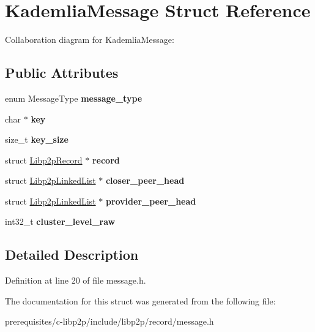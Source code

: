 \hypertarget{struct_kademlia_message}{}\section{Kademlia\+Message Struct Reference}
\label{struct_kademlia_message}


Collaboration diagram for Kademlia\+Message\+:
\subsection*{Public Attributes}
\begin{DoxyCompactItemize}
\item 
\mbox{\label{struct_kademlia_message_a3d1f6ddf5f040f5f9406c23cd481f46d}} 
enum Message\+Type {\bfseries message\+\_\+type}
\item 
\mbox{\label{struct_kademlia_message_a5bd751792a56acbd61fc4fd094b7ea99}} 
char $\ast$ {\bfseries key}
\item 
\mbox{\label{struct_kademlia_message_a5837e9a6217659add376e790d0f4b769}} 
size\+\_\+t {\bfseries key\+\_\+size}
\item 
\mbox{\label{struct_kademlia_message_a4a24c1bbd208b01ce58ecea6285905d0}} 
struct \mbox{\hyperlink{struct_libp2p_record}{Libp2p\+Record}} $\ast$ {\bfseries record}
\item 
\mbox{\label{struct_kademlia_message_aab40366031d656f44294e30a2a872ac7}} 
struct \mbox{\hyperlink{struct_libp2p_linked_list}{Libp2p\+Linked\+List}} $\ast$ {\bfseries closer\+\_\+peer\+\_\+head}
\item 
\mbox{\label{struct_kademlia_message_a83d757d26ff4f47a2d20454c84d65c43}} 
struct \mbox{\hyperlink{struct_libp2p_linked_list}{Libp2p\+Linked\+List}} $\ast$ {\bfseries provider\+\_\+peer\+\_\+head}
\item 
\mbox{\label{struct_kademlia_message_af488717045883d1bfb5a3f533442587e}} 
int32\+\_\+t {\bfseries cluster\+\_\+level\+\_\+raw}
\end{DoxyCompactItemize}


\subsection{Detailed Description}


Definition at line 20 of file message.\+h.



The documentation for this struct was generated from the following file\+:\begin{DoxyCompactItemize}
\item 
prerequisites/c-\/libp2p/include/libp2p/record/message.\+h\end{DoxyCompactItemize}
